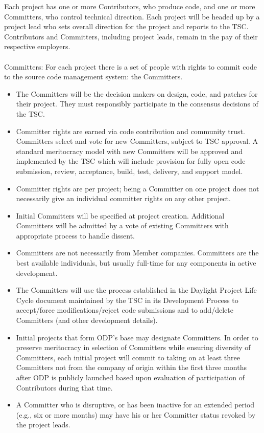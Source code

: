 \documentclass[a4paper, 12pt]{book}
\begin{document}
Each project has one or more Contributors, who produce code, and one or more Committers, who control technical direction.  Each project will be headed up by a project lead who sets overall direction for the project and reports to the TSC.  Contributors and Committers, including project leads, remain in the pay of their respective employers.\\
\\
Committers: For each project there is a set of people with rights to commit code to the source code management system: the Committers.
\begin{itemize}\itemsep0pt
\item{The Committers will be the decision makers on design, code, and patches for their project. They must responsibly participate in the consensus decisions of the TSC.}
\item{Committer rights are earned via code contribution and community trust.   Committers select and vote for new Committers, subject to TSC approval.  A standard meritocracy model with new Committers will be approved and implemented by the TSC which will include provision for fully open code submission, review, acceptance, build, test, delivery, and support model.}
\item{Committer rights are per project; being a Committer on one project does not necessarily give an individual committer rights on any other project.}
\item{Initial Committers will be specified at project creation.  Additional Committers will be admitted by a vote of existing Committers with appropriate process to handle dissent.}
\item{Committers are not necessarily from Member companies.  Committers are the best available individuals, but usually full-time for any components in active development.}
\item{The Committers will use the process established in the Daylight Project Life Cycle document maintained by the TSC in its Development Process to accept/force modifications/reject code submissions and to add/delete Committers (and other development details).}
\item{Initial projects that form ODP’s base may designate Committers.  In order to preserve meritocracy in selection of Committers while ensuring diversity of Committers, each initial project will commit to taking on at least three Committers not from the company of origin within the first three months after ODP is publicly launched based upon evaluation of participation of Contributors during that time.}
\item{A Committer who is disruptive, or has been inactive for an extended period (e.g., six or more months) may have his or her Committer status revoked by the project leads.}
\end{itemize}
\end{document}
